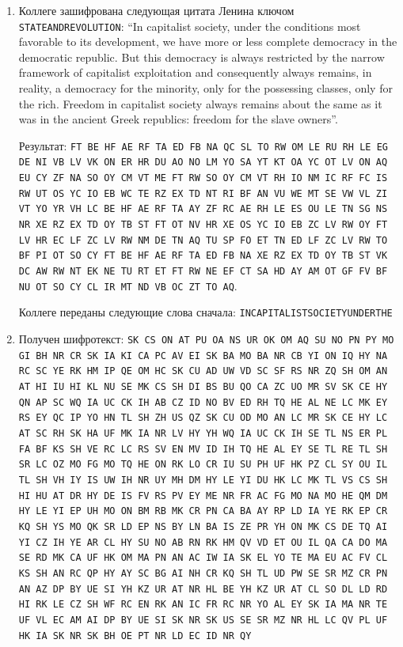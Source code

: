 \documentclass[a4paper, 14pt]{extarticle}
\begin{document}
\begin{enumerate}
    \item Коллеге зашифрована следующая цитата Ленина ключом \texttt{STATEANDREVOLUTION}: ``In capitalist society, under the conditions most favorable to its development, we have more or less complete democracy in the democratic republic. But this democracy is always restricted by the narrow framework of capitalist exploitation and consequently always remains, in reality, a democracy for the minority, only for the possessing classes, only for the rich. Freedom in capitalist society always remains about the same as it was in the ancient Greek republics: freedom for the slave owners''.

    Результат: \texttt{FT BE HF AE RF TA ED FB NA QC SL TO RW OM LE RU RH LE EG DE NI VB LV VK ON ER HR DU AO NO LM YO SA YT KT OA YC OT LV ON AQ EU CY ZF NA SO OY CM VT ME FT RW SO OY CM VT RH IO NM IC RF FC IS RW UT OS YC IO EB WC TE RZ EX TD NT RI BF AN VU WE MT SE VW VL ZI VT YO YR VH LC BE HF AE RF TA AY ZF RC AE RH LE ES OU LE TN SG NS NR XE RZ EX TD OY TB ST FT OT NV HR XE OS YC IO EB ZC LV RW OY FT LV HR EC LF ZC LV RW NM DE TN AQ TU SP FO ET TN ED LF ZC LV RW TO BF PI OT SO CY FT BE HF AE RF TA ED FB NA XE RZ EX TD OY TB ST VK DC AW RW NT EK NE TU RT ET FT RW NE EF CT SA HD AY AM OT GF FV BF NU OT SO CY CL IR MT ND VB OC ZT TO AQ}.

    Коллеге переданы следующие слова сначала: \texttt{INCAPITALISTSOCIETYUNDERTHE} 

    \item Получен шифротекст: \texttt{SK CS ON AT PU OA NS UR OK OM AQ SU NO PN PY MO GI BH NR CR SK IA KI CA PC AV EI SK BA MO BA NR CB YI ON IQ HY NA RC SC YE RK HM IP QE OM HC SK CU AD UW VD SC SF RS NR ZQ SH OM AN AT HI IU HI KL NU SE MK CS SH DI BS BU QO CA ZC UO MR SV SK CE HY QN AP SC WQ IA UC CK IH AB CZ ID NO BV ED RH TQ HE AL NE LC MK EY RS EY QC IP YO HN TL SH ZH US QZ SK CU OD MO AN LC MR SK CE HY LC AT SC RH SK HA UF MK IA NR LV HY YH WQ IA UC CK IH SE TL NS ER PL FA BF KS SH VE RC LC RS SV EN MV ID IH TQ HE AL EY SE TL RE TL SH SR LC OZ MO FG MO TQ HE ON RK LO CR IU SU PH UF HK PZ CL SY OU IL TL SH VH IY IS UW IH NR UY MH DM HY LE YI DU HK LC MK TL VS CS SH HI HU AT DR HY DE IS FV RS PV EY ME NR FR AC FG MO NA MO HE QM DM HY LE YI EP UH MO ON BM RB MK CR PN CA BA AY RP LD IA YE RK EP CR KQ SH YS MO QK SR LD EP NS BY LN BA IS ZE PR YH ON MK CS DE TQ AI YI CZ IH YE AR CL HY SU NO AB RN RK HM QV VD ET OU IL QA CA DO MA SE RD MK CA UF HK OM MA PN AN AC IW IA SK EL YO TE MA EU AC FV CL KS SH AN RC QP HY AY SC BG AI NH CR KQ SH TL UD PW SE SR MZ CR PN AN AZ DP BY UE SI YH KZ UR AT NR HL BE YH KZ UR AT CL SO DL LD RD HI RK LE CZ SH WF RC EN RK AN IC FR RC NR YO AL EY SK IA MA NR TE UF VL EC AM AI DP BY UE SI SK NR SK US SE SR MZ NR HL LC QV PL UF HK IA SK NR SK BH OE PT NR LD EC ID NR QY}


\end{enumerate}
\end{document}
